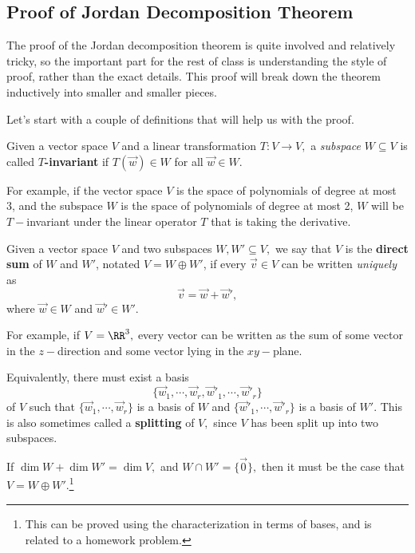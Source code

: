 \subsection{Proof of Jordan Decomposition Theorem}
The proof of the Jordan decomposition theorem is quite involved and relatively tricky, so the important part for the rest of class is understanding the style of proof, rather than the exact details. This proof will break down the theorem inductively into smaller and smaller pieces. 

Let's start with a couple of definitions that will help us with the proof. 
\begin{definition}
Given a vector space $V$ and a linear transformation $T: V \rightarrow V,$ a \emph{subspace} $W \subseteq V$ is called \textbf{$T$-invariant} if $T(\vec{w}) \in W$ for all $\vec{w} \in W.$
\end{definition}

For example, if the vector space $V$ is the space of polynomials of degree at most 3, and the subspace $W$ is the space of polynomials of degree at most 2, $W$ will be $T-$invariant under the linear operator $T$ that is taking the derivative.

\begin{definition}
Given a vector space $V$ and two subspaces $W, W' \subseteq V,$ we say that $V$ is the \textbf{direct sum} of $W$ and $W'$, notated $V = W \oplus W'$, if every $\vec{v} \in V$ can be written \emph{uniquely} as 
\[
\vec{v} = \vec{w} + \vec{w}',
\]
where $\vec{w} \in W$ and $\vec{w}' \in W'.$
\end{definition}

For example, if $V = \RR^3,$ every vector can be written as the sum of some vector in the $z-$direction and some vector lying in the $xy-$plane. 

Equivalently, there must exist a basis \[
\{\vec{w}_1, \cdots, \vec{w}_r, \vec{w}'_1, \cdots, \vec{w}'_r\}
\]
of $V$ such that 
$\{\vec{w}_1, \cdots, \vec{w}_r\}$ is a basis of $W$ and $\{\vec{w}'_1, \cdots, \vec{w}'_r\}$ is a basis of $W'$. This is also sometimes called a \textbf{splitting} of $V,$ since $V$ has been split up into two subspaces.

\begin{theorem}\label{splitting thm}
If $\dim W + \dim W' = \dim V,$ and $W \cap W' = \{\vec{0}\},$ then it must be the case that $V = W \oplus W'.$\footnote{This can be proved using the characterization in terms of bases, and is related to a homework problem.}
\end{theorem}

